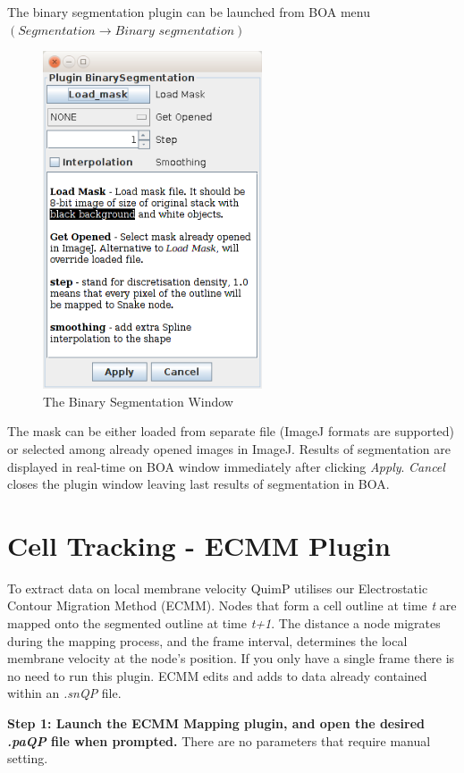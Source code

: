 \documentclass[a4paper,12pt]{article}
\begin{document}
The binary segmentation plugin can be launched from BOA menu $(\textit{Segmentation}\rightarrow \textit{Binary segmentation})$

\begin{figure}[hp]
	\centering
	\includegraphics[height=10cm]{BinarySeg.png}
	\caption{The Binary Segmentation Window}
	\label{BinarySegWindow}
\end{figure}

The mask can be either loaded from separate file (ImageJ formats are supported) or selected among already opened images in ImageJ. Results of segmentation are displayed in real-time on BOA window immediately after clicking \textit{Apply}. \textit{Cancel} closes the plugin window leaving last results of segmentation in BOA.    
 
\section{Cell Tracking - ECMM Plugin}

To extract data on local membrane velocity QuimP utilises our Electrostatic Contour Migration Method (ECMM).  
Nodes that form a cell outline at time \textit{t} are mapped onto the segmented outline at time \textit{t+1}.  The distance a node migrates
during the mapping process, and the frame interval, determines the local membrane velocity at the node's position.  If you only have a single
frame there is no need to run this plugin.  ECMM edits and adds to data 
already contained within an \textit{.snQP} file.

\textbf{Step 1: Launch the ECMM Mapping plugin, and open the desired \textit{.paQP} file when prompted.}  There are no parameters that
require manual setting.
\end{document}
